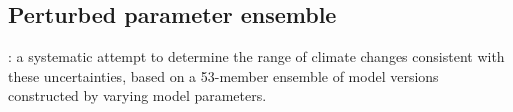 
\subsection{Perturbed parameter ensemble}
 
 \cite{Murphy2004quantification}: a systematic attempt to determine the range of climate changes consistent with these uncertainties, based on a 53-member ensemble of model versions constructed by varying model parameters.
 

